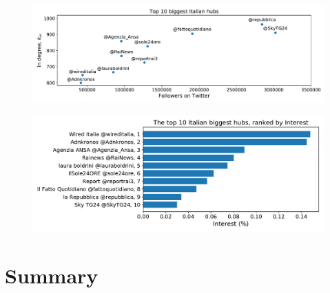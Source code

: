 \documentclass[11pt, twoside]{report}
\begin{document}
    \begin{figure}[htbp]
      \centering
      \includegraphics[width=\textwidth]{../../scripts/network_analysis/imgs/hubs_followers_ita.pdf}            
      \caption{}
      \label{fig:hubs_followers_ita}
    \end{figure}

    \begin{figure}[htbp]
      \centering
      \includegraphics[width=\textwidth]{../../scripts/network_analysis/imgs/hubs_interest_ita.pdf}            
      \caption{}
      \label{fig:hubs_followers_ita}
    \end{figure}

    


    

    

    

    \chapter{Summary}




\printbibliography[title={References}]
\end{document}
